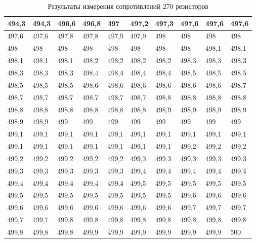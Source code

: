 \documentclass[a4paper, 12pt]{article}
\begin{document}
\begin{table}[!ht]
    \label{tab:table}
    \caption{Результаты измерения сопротивлений 270 резисторов}
    \centering
    \begin{tabular}{|l|l|l|l|l|l|l|l|l|l|}
    \hline
        494,3 & 494,3 & 496,6 & 496,8 & 497 & 497,2 & 497,3 & 497,6 & 497,6 & 497,6 \\ \hline
        497,6 & 497,6 & 497,8 & 497,8 & 497,9 & 497,9 & 498 & 498 & 498 & 498 \\ \hline
        498 & 498 & 498 & 498 & 498 & 498 & 498 & 498 & 498,1 & 498,1 \\ \hline
        498,1 & 498,1 & 498,1 & 498,2 & 498,2 & 498,2 & 498,2 & 498,3 & 498,3 & 498,3 \\ \hline
        498,3 & 498,3 & 498,3 & 498,4 & 498,4 & 498,4 & 498,4 & 498,5 & 498,5 & 498,5 \\ \hline
        498,5 & 498,5 & 498,5 & 498,6 & 498,6 & 498,6 & 498,6 & 498,6 & 498,6 & 498,7 \\ \hline
        498,7 & 498,7 & 498,7 & 498,7 & 498,7 & 498,7 & 498,8 & 498,8 & 498,8 & 498,8 \\ \hline
        498,8 & 498,8 & 498,8 & 498,8 & 498,8 & 498,8 & 498,9 & 498,9 & 498,9 & 498,9 \\ \hline
        498,9 & 498,9 & 499 & 499 & 499 & 499 & 499 & 499 & 499 & 499 \\ \hline
        499,1 & 499,1 & 499,1 & 499,1 & 499,1 & 499,1 & 499,1 & 499,1 & 499,1 & 499,1 \\ \hline
        499,1 & 499,1 & 499,1 & 499,1 & 499,1 & 499,1 & 499,1 & 499,2 & 499,2 & 499,2 \\ \hline
        499,2 & 499,2 & 499,2 & 499,2 & 499,2 & 499,3 & 499,3 & 499,3 & 499,3 & 499,3 \\ \hline
        499,3 & 499,3 & 499,3 & 499,3 & 499,3 & 499,4 & 499,4 & 499,4 & 499,4 & 499,4 \\ \hline
        499,4 & 499,4 & 499,4 & 499,4 & 499,4 & 499,5 & 499,5 & 499,5 & 499,5 & 499,5 \\ \hline
        499,5 & 499,5 & 499,5 & 499,5 & 499,5 & 499,5 & 499,5 & 499,6 & 499,6 & 499,6 \\ \hline
        499,6 & 499,6 & 499,6 & 499,6 & 499,6 & 499,6 & 499,6 & 499,7 & 499,7 & 499,7 \\ \hline
        499,7 & 499,7 & 499,8 & 499,8 & 499,8 & 499,8 & 499,8 & 499,8 & 499,8 & 499,8 \\ \hline
        499,8 & 499,8 & 499,8 & 499,9 & 499,9 & 499,9 & 499,9 & 499,9 & 499,9 & 500 \\ \hline

\end{tabular}
\end{table}
\end{document}
